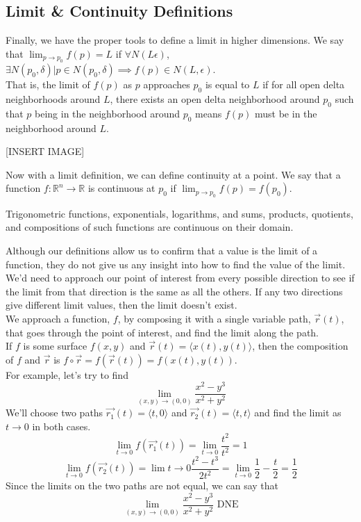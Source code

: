 \subsection{Limit \& Continuity Definitions}
\noindent
Finally, we have the proper tools to define a limit in higher dimensions. We say that $\lim_{p\to p_0}f(p)=L$ if $\forall N(L\epsilon)$, $\exists N(p_0,\delta)|p\in N(p_0,\delta)\implies f(p)\in N(L,\epsilon)$.\\
That is, the limit of $f(p)$ as $p$ approaches $p_0$ is equal to $L$ if for all open delta neighborhoods around $L$, there exists an open delta neighborhood around $p_0$ such that $p$ being in the neighborhood around $p_0$ means $f(p)$ must be in the neighborhood around $L$.

[INSERT IMAGE]

\noindent
Now with a limit definition, we can define continuity at a point. We say that a function $f : \mathbb{R}^n\to\mathbb{R}$ is continuous at $p_0$ if $\lim_{p\to p_0}{f(p)}=f(p_0)$.\\

\noindent
\begin{theorem}
	Trigonometric functions, exponentials, logarithms, and sums, products, quotients, and compositions of such functions are continuous on their domain.
\end{theorem}

\noindent
Although our definitions allow us to confirm that a value is the limit of a function, they do not give us any insight into how to find the value of the limit. We'd need to approach our point of interest from every possible direction to see if the limit from that direction is the same as all the others. If any two directions give different limit values, then the limit doesn't exist.\\
We approach a function, $f$, by composing it with a single variable path, $\vec{r}(t)$, that goes through the point of interest, and find the limit along the path.\\

\noindent
If $f$ is some surface $f(x,y)$ and $\vec{r}(t)=\langle x(t), y(t)\rangle$, then the composition of $f$ and $\vec{r}$ is $f\circ\vec{r}=f(\vec{r}(t))=f(x(t),y(t))$.\\
For example, let's try to find $$\lim_{(x,y)\to(0,0)}{\frac{x^2-y^3}{x^2+y^2}}$$
\indent
We'll choose two paths $\vec{r_1}(t)=\langle t,0\rangle$ and $\vec{r_2}(t)=\langle t,t\rangle$ and find the limit as $t\to 0$ in both cases.\\
\indent
$$\lim_{t\to 0}{f(\vec{r_1}(t))}=\lim_{t\to 0}{\frac{t^2}{t^2}}=1$$
\indent
$$\lim_{t\to 0}{f(\vec{r_2}(t))}=\lim{t\to 0}{\frac{t^2-t^3}{2t^2}}=\lim_{t\to 0}{\frac{1}{2}-\frac{t}{2}}=\frac{1}{2}$$
\indent
Since the limits on the two paths are not equal, we can say that $$\lim_{(x,y)\to(0,0)}{\frac{x^2-y^3}{x^2+y^2}} \text{ DNE}$$